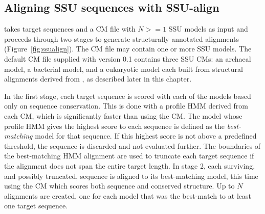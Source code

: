\subsection{Aligning SSU sequences with SSU-align}

 takes target sequences and a CM file with $N >=
1$ SSU models as input and proceeds through two stages to generate
structurally annotated alignments (Figure~\ref{fig:ssualign}).  The CM
file
may contain one or more SSU models. The default CM file supplied with
 version 0.1 contains three SSU CMs: an archaeal model,
a bacterial model, and a eukaryotic model each
built from structural alignments derived from 
\cite{CannoneGutell02}, as described later in this chapter. 

In the first stage, each target sequence is scored with each of the
models based only on sequence conservation. This is done with a
profile HMM derived from each CM, which is significantly faster than
using the CM\@.  The model whose profile HMM gives the highest score to
each sequence is defined as the \emph{best-matching} model for that
sequence. If this highest score is not above a predefined threshold,
the sequence is discarded and not evaluated further. The boundaries of
the best-matching HMM alignment are used to truncate each target
sequence if the alignment does not span the entire target length.  In
stage 2, each surviving, and possibly truncated, sequence is aligned
to its best-matching model, this time using the CM which scores
both sequence and conserved structure. Up to $N$ alignments are
created, one for each model that was the best-match to at least one
target sequence.


